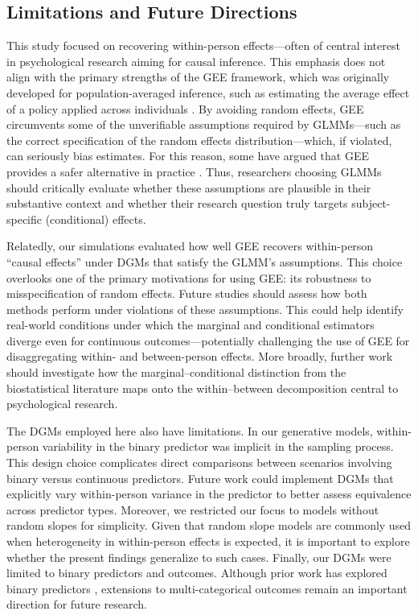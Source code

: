 \subsection{Limitations and Future Directions}

This study focused on recovering within-person effects—often of central interest in psychological research aiming for causal inference. This emphasis does not align with the primary strengths of the GEE framework, which was originally developed for population-averaged inference, such as estimating the average effect of a policy applied across individuals \parencite[]{allison_logistic_1999}. By avoiding random effects, GEE circumvents some of the unverifiable assumptions required by GLMMs—such as the correct specification of the random effects distribution—which, if violated, can seriously bias estimates. For this reason, some have argued that GEE provides a safer alternative in practice \parencite[]{hubbard_gee_2010}. Thus, researchers choosing GLMMs should critically evaluate whether these assumptions are plausible in their substantive context and whether their research question truly targets subject-specific (conditional) effects.

Relatedly, our simulations evaluated how well GEE recovers within-person ``causal effects'' under DGMs that satisfy the GLMM's assumptions. This choice overlooks one of the primary motivations for using GEE: its robustness to misspecification of random effects. Future studies should assess how both methods perform under violations of these assumptions. This could help identify real-world conditions under which the marginal and conditional estimators diverge even for continuous outcomes—potentially challenging the use of GEE for disaggregating within- and between-person effects. More broadly, further work should investigate how the marginal–conditional distinction from the biostatistical literature maps onto the within–between decomposition central to psychological research.

The DGMs employed here also have limitations. In our generative models, within-person variability in the binary predictor was implicit in the sampling process. This design choice complicates direct comparisons between scenarios involving binary versus continuous predictors. Future work could implement DGMs that explicitly vary within-person variance in the predictor to better assess equivalence across predictor types. Moreover, we restricted our focus to models without random slopes for simplicity. Given that random slope models are commonly used when heterogeneity in within-person effects is expected, it is important to explore whether the present findings generalize to such cases. Finally, our DGMs were limited to binary predictors and outcomes. Although prior work has explored binary predictors \parencite[e.g.,][]{yaremych_centering_2023},  extensions to multi-categorical outcomes remain an important direction for future research.

